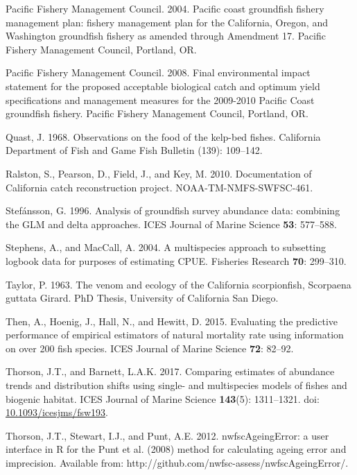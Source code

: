 \documentclass[12pt,]{article}
\begin{document}
\hypertarget{ref-PFMC2004}{}
Pacific Fishery Management Council. 2004. Pacific coast groundfish
fishery management plan: fishery management plan for the California,
Oregon, and Washington groundfish fishery as amended through Amendment
17. Pacific Fishery Management Council, Portland, OR.

\hypertarget{ref-PFMC2008}{}
Pacific Fishery Management Council. 2008. Final environmental impact
statement for the proposed acceptable biological catch and optimum yield
specifications and management measures for the 2009-2010 Pacific Coast
groundfish fishery. Pacific Fishery Management Council, Portland, OR.

\hypertarget{ref-Quast1968}{}
Quast, J. 1968. Observations on the food of the kelp-bed fishes.
California Department of Fish and Game Fish Bulletin (139): 109--142.

\hypertarget{ref-Ralston2010}{}
Ralston, S., Pearson, D., Field, J., and Key, M. 2010. Documentation of
California catch reconstruction project. NOAA-TM-NMFS-SWFSC-461.

\hypertarget{ref-Stefansson1996}{}
Stefánsson, G. 1996. Analysis of groundfish survey abundance data:
combining the GLM and delta approaches. ICES Journal of Marine Science
\textbf{53}: 577--588.

\hypertarget{ref-Stephens2004}{}
Stephens, A., and MacCall, A. 2004. A multispecies approach to
subsetting logbook data for purposes of estimating CPUE. Fisheries
Research \textbf{70}: 299--310.

\hypertarget{ref-Taylor1963}{}
Taylor, P. 1963. The venom and ecology of the California scorpionfish,
Scorpaena guttata Girard. PhD Thesis, University of California San
Diego.

\hypertarget{ref-Then2015}{}
Then, A., Hoenig, J., Hall, N., and Hewitt, D. 2015. Evaluating the
predictive performance of empirical estimators of natural mortality rate
using information on over 200 fish species. ICES Journal of Marine
Science \textbf{72}: 82--92.

\hypertarget{ref-Thorson2017}{}
Thorson, J.T., and Barnett, L.A.K. 2017. Comparing estimates of
abundance trends and distribution shifts using single- and multispecies
models of fishes and biogenic habitat. ICES Journal of Marine Science
\textbf{143}(5): 1311--1321. doi:
\href{https://doi.org/10.1093/icesjms/fsw193}{10.1093/icesjms/fsw193}.

\hypertarget{ref-Thorson2012}{}
Thorson, J.T., Stewart, I.J., and Punt, A.E. 2012. nwfscAgeingError: a
user interface in R for the Punt et al. (2008) method for calculating
ageing error and imprecision. Available from:
http://github.com/nwfsc-assess/nwfscAgeingError/.
\end{document}
